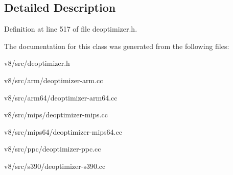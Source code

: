 \subsection{Detailed Description}


Definition at line 517 of file deoptimizer.\+h.



The documentation for this class was generated from the following files\+:\begin{DoxyCompactItemize}
\item 
v8/src/deoptimizer.\+h\item 
v8/src/arm/deoptimizer-\/arm.\+cc\item 
v8/src/arm64/deoptimizer-\/arm64.\+cc\item 
v8/src/mips/deoptimizer-\/mips.\+cc\item 
v8/src/mips64/deoptimizer-\/mips64.\+cc\item 
v8/src/ppc/deoptimizer-\/ppc.\+cc\item 
v8/src/s390/deoptimizer-\/s390.\+cc\end{DoxyCompactItemize}
